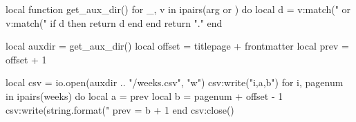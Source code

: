 \documentclass{./guidednotes/guidednotes}
\theoremstyle{definition}
\begin{document}
% 
% 
\backmatter{}

% 
% 
\begin{luacode*}
local function get_aux_dir()
  for _, v in ipairs(arg or {}) do
    local d = v:match("%
               or v:match("%
    if d then return d end
  end
  return "."
end

local auxdir = get_aux_dir()
local offset = titlepage + frontmatter
local prev   = offset + 1

local csv = io.open(auxdir .. "/weeks.csv", "w")
csv:write("i,a,b\n")
for i, pagenum in ipairs(weeks) do
  local a = prev
  local b = pagenum + offset - 1
  csv:write(string.format("%
  prev = b + 1
end
csv:close()
\end{luacode*}
\end{document}
